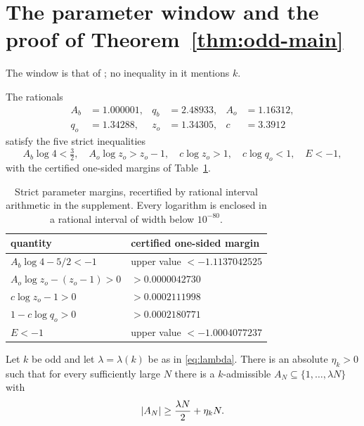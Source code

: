 \documentclass[11pt]{article}
\begin{document}
\section{The parameter window and the proof of Theorem~\ref{thm:odd-main}}
\label{sec:assembly}

The window is that of \cite[\S6]{DellaPietra2026}; no inequality in it
mentions \(k\).

\begin{lemma}\label{lem:window}
The rationals
\begin{equation}\label{eq:parameters}
\begin{aligned}
 A_b&=1.000001,&q_b&=2.48933,&A_o&=1.16312,\\
 q_o&=1.34288,&z_o&=1.34305,&c&=3.3912
\end{aligned}
\end{equation}
satisfy the five strict inequalities
\begin{equation}\label{eq:parameter-inequalities}
 A_b\log4<\tfrac32,\quad
 A_o\log z_o>z_o-1,\quad
 c\log z_o>1,\quad
 c\log q_o<1,\quad
 E<-1,
\end{equation}
with the certified one-sided margins of Table~\ref{tab:margins}.
\end{lemma}

\begin{table}[ht]
\centering
\begin{tabular}{ll}
\hline
quantity & certified one-sided margin\\
\hline
\(A_b\log4-5/2<-1\) & upper value \(<-1.1137042525\)\\
\(A_o\log z_o-(z_o-1)>0\) & \(>0.0000042730\)\\
\(c\log z_o-1>0\) & \(>0.0002111998\)\\
\(1-c\log q_o>0\) & \(>0.0002180771\)\\
\(E<-1\) & upper value \(<-1.0004077237\)\\
\hline
\end{tabular}
\caption{Strict parameter margins, recertified by rational interval
arithmetic in the supplement. Every logarithm is enclosed in a rational
interval of width below \(10^{-80}\).}
\label{tab:margins}
\end{table}

\begin{theorem}\label{thm:even-form}
Let \(k\) be odd and let \(\lambda=\lambda(k)\) be as in \eqref{eq:lambda}.
There is an absolute \(\eta_k>0\) such that for every sufficiently large
\(N\) there is a \(k\)-admissible \(A_N\subseteq\{1,\ldots,\lambda N\}\) with
\[
 \left|A_N\right|\geq\frac{\lambda N}{2}+\eta_k N .
\]
\end{theorem}
\end{document}

